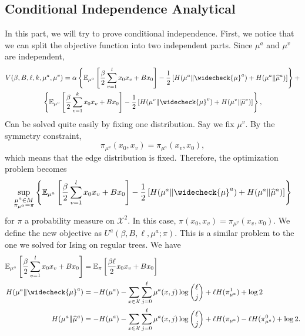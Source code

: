 \documentclass[12pt]{article}
\numberwithin{equation}{section}
\begin{document}
\newpage

\subsection{Conditional Independence Analytical}

In this part, we will try to prove conditional independence. First, we notice that we can split the objective function into two independent parts.
Since $\mu^a$ and $\mu^v$ are independent,
\begin{multline}
    V(\beta, B, \ell, k, \mu^a, \mu^v) = \alpha \left\{\mathbb{E}_{\mu^a}\left[\frac\beta2\sum_{v=1}^l x_0x_v + B x_0\right]
    - \frac12\left[H(\mu^a\|\widecheck{\mu}^a)+H(\mu^a\|\widehat{\mu}^a)\right]\right\} +                                      \\
    \left\{\mathbb{E}_{\mu^v}\left[\frac\beta2\sum_{v=1}^k x_0x_v + B x_0\right]
    - \frac12\left[H(\mu^v\|\widecheck{\mu}^v)+H(\mu^v\|\widehat{\mu}^v)\right]\right\},
\end{multline}
Can be solved quite easily by fixing one distribution.
Say we fix $\mu^v$. By the symmetry constraint,
\begin{equation*}
    \pi_{\mu^a}(x_0, x_v) = \pi_{\mu^a}(x_v, x_0),
\end{equation*}
which means that the edge distribution is fixed. Therefore, the optimization problem becomes
\begin{equation}
    \sup_{\substack{\mu^a\in M \\ \pi_{\mu^a}=\pi}} \left\{\mathbb{E}_{\mu^a}\left[\frac\beta2\sum_{v=1}^l x_0x_v + B x_0\right]
    - \frac12\left[H(\mu^a\|\widecheck{\mu}^a)+H(\mu^a\|\widehat{\mu}^a)\right]\right\}
\end{equation}
for $\pi$ a probability measure on $\mathcal{X}^2$. In this case, $\pi(x_0, x_v) = \pi_{\mu^v}(x_v, x_0)$. We define the new objective as $U^a(\beta, B, \ell, \mu^a; \pi)$.
This is a similar problem to the one we solved for Ising on regular trees. We have
\begin{align*}
    \mathbb{E}_{\mu^a}\left[\frac\beta2\sum_{v=1}^l x_0x_v + B x_0\right] & = \mathbb{E}_\pi\left[\frac{\beta\ell}{2}x_0 x_v+Bx_0\right]                                                                        \\
    H(\mu^a\|\widecheck{\mu}^a)                                           & = -H(\mu^a)-\sum_{x\in\mathcal{X}}\sum_{j=0}^\ell\mu^a(x, j)\log{\ell\choose j} +\ell H(\pi_{\mu^a}^1)  + \log2                     \\
    H(\mu^a\|\widehat{\mu}^a)                                             & = -H(\mu^a)-\sum_{x\in\mathcal{X}}\sum_{j=0}^\ell\mu^a(x, j)\log{\ell\choose j} +\ell H(\pi_{\mu^a})-\ell H(\pi_{\mu^a}^0) + \log2.
\end{align*}
\end{document}
